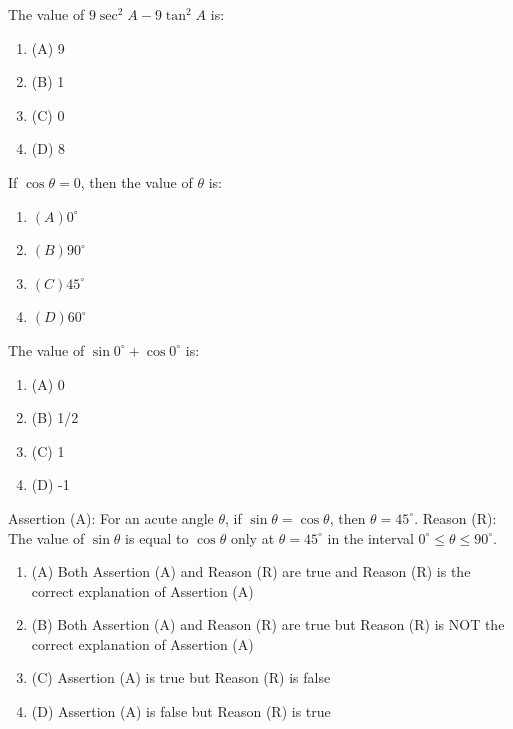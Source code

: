 \documentclass[12pt,a4paper]{exam}
\begin{document}
\begin{questions}
\question[1] The value of $9\sec^2 A - 9\tan^2 A$ is:
\begin{enumerate}[label=(\Alph*)]
  \item (A) 9
  \item (B) 1
  \item (C) 0
  \item (D) 8
\end{enumerate}
\vspace{0.15cm}

\question[1] If $\cos \theta = 0$, then the value of $\theta$ is:
\begin{enumerate}[label=(\Alph*)]
  \item $(A) 0^\circ$
  \item $(B) 90^\circ$
  \item $(C) 45^\circ$
  \item $(D) 60^\circ$
\end{enumerate}
\vspace{0.15cm}

\question[1] The value of $\sin 0^\circ + \cos 0^\circ$ is:
\begin{enumerate}[label=(\Alph*)]
  \item (A) 0
  \item (B) 1/2
  \item (C) 1
  \item (D) -1
\end{enumerate}
\vspace{0.15cm}

\question[1] Assertion (A): For an acute angle $\theta$, if $\sin \theta = \cos \theta$, then $\theta = 45^\circ$. 
Reason (R): The value of $\sin \theta$ is equal to $\cos \theta$ only at $\theta = 45^\circ$ in the interval $0^\circ \le \theta \le 90^\circ$.
\begin{enumerate}[label=(\Alph*)]
  \item (A) Both Assertion (A) and Reason (R) are true and Reason (R) is the correct explanation of Assertion (A)
  \item (B) Both Assertion (A) and Reason (R) are true but Reason (R) is NOT the correct explanation of Assertion (A)
  \item (C) Assertion (A) is true but Reason (R) is false
  \item (D) Assertion (A) is false but Reason (R) is true
\end{enumerate}
\vspace{0.15cm}


\end{questions}
\end{document}
